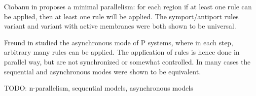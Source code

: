 
Ciobanu in \cite{Ciobanu:2007:MinimalParallelism} proposes a minimal parallelism: for each region if at least one rule can be applied, then at least one rule will be applied. The symport/antiport rules variant and variant with active membranes were both shown to be universal.


Freund in \cite{Freund:2004:Async} studied the asynchronous mode of P systems, where in each step, arbitrary many rules can be applied. The application of rules is hence done in parallel way, but are not synchronized or somewhat controlled. In many cases the sequential and asynchronous modes were shown to be equivalent.

TODO: n-parallelism, sequential models, asynchronous models

